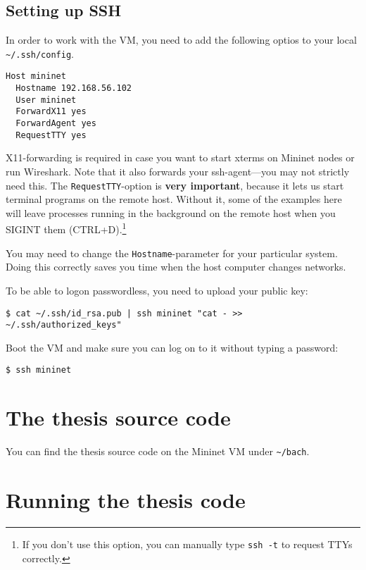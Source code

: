 \subsection{Setting up SSH}
\label{chapter:ssh.setup}

In order to work with the VM, you need to add the following optios to your
local \texttt{\~{}/.ssh/config}.

\begin{verbatim}
Host mininet
  Hostname 192.168.56.102
  User mininet
  ForwardX11 yes
  ForwardAgent yes
  RequestTTY yes
\end{verbatim}

X11-forwarding is required in case you want to start xterms on Mininet
nodes or run Wireshark.  Note that it also forwards your
ssh-agent---you may not strictly need this.  The \texttt{RequestTTY}-option
is \textbf{very important}, because it lets us start terminal programs on the remote
host. Without it, some of the examples here will leave processes running in
the background on the remote host when you SIGINT them (CTRL+D).\footnote{If
you don't use this option, you can manually type \texttt{ssh -t} to request
TTYs correctly.}

You may need to change the \texttt{Hostname}-parameter for your particular
system.  Doing this correctly saves you time when the host computer changes
networks.

To be able to logon passwordless, you need to upload your public key:

\begin{verbatim}
$ cat ~/.ssh/id_rsa.pub | ssh mininet "cat - >> ~/.ssh/authorized_keys"
\end{verbatim}

Boot the VM and make sure you can log on to it without typing a password:

\begin{verbatim}
$ ssh mininet
\end{verbatim}

\section{The thesis source code}

You can find the thesis source code on the Mininet VM under
\texttt{\~{}/bach}.

\section{Running the thesis code}

